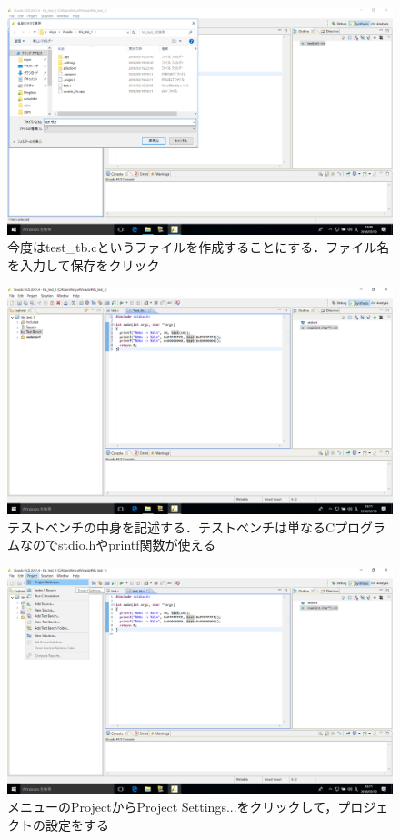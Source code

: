 \documentclass[a4paper,dvipdfmx]{jsarticle}
\begin{document}
 \begin{figure}[H]
  \begin{center}
   \includegraphics[width=.8\textwidth]{chapter08_figures/VirtualBox_Windows10_19_03_2018_23_14_03.png}
  \end{center}
  \caption{今度はtest\_tb.cというファイルを作成することにする．ファイル名を入力して保存をクリック}
 \end{figure}

 \begin{figure}[H]
  \begin{center}
   \includegraphics[width=.8\textwidth]{chapter08_figures/VirtualBox_Windows10_19_03_2018_23_15_37.png}
  \end{center}
  \caption{テストベンチの中身を記述する．テストベンチは単なるCプログラムなのでstdio.hやprintf関数が使える}
 \end{figure}

 \begin{figure}[H]
  \begin{center}
   \includegraphics[width=.8\textwidth]{chapter08_figures/VirtualBox_Windows10_19_03_2018_23_15_45.png}
  \end{center}
  \caption{メニューのProjectからProject Settings...をクリックして，プロジェクトの設定をする}
 \end{figure}
\end{document}
